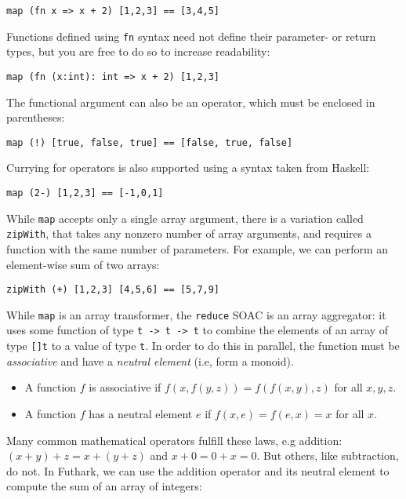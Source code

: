 \documentclass[11pt]{book}
\begin{document}
\begin{lstlisting}
map (fn x => x + 2) [1,2,3] == [3,4,5]
\end{lstlisting}

Functions defined using \texttt{fn} syntax need not define their
parameter- or return types, but you are free to do so to increase
readability:

\begin{lstlisting}
map (fn (x:int): int => x + 2) [1,2,3]
\end{lstlisting}

The functional argument can also be an operator, which must be
enclosed in parentheses:

\begin{lstlisting}
map (!) [true, false, true] == [false, true, false]
\end{lstlisting}

Currying for operators is also supported using a syntax taken from
Haskell:

\begin{lstlisting}
map (2-) [1,2,3] == [-1,0,1]
\end{lstlisting}

While \texttt{map} accepts only a single array argument, there is a
variation called \texttt{zipWith}, that takes any nonzero number of
array arguments, and requires a function with the same number of
parameters.  For example, we can perform an element-wise sum of two
arrays:

\begin{lstlisting}
zipWith (+) [1,2,3] [4,5,6] == [5,7,9]
\end{lstlisting}

While \texttt{map} is an array transformer, the \texttt{reduce} SOAC
is an array aggregator: it uses some function of type \texttt{t -> t
  -> t} to combine the elements of an array of type \texttt{[]t} to a
value of type \texttt{t}.  In order to do this in parallel, the
function must be \textit{associative} and have a \textit{neutral
  element} (i.e, form a monoid).

\begin{itemize}
\item A function $f$ is associative if $f(x,f(y,z)) = f(f(x,y),z)$ for
  all $x,y,z$.
\item A function $f$ has a neutral element $e$ if
  $f(x,e) = f(e,x) = x$ for all $x$.
\end{itemize}

Many common mathematical operators fulfill these laws, e.g addition:
$(x+y)+z=x+(y+z)$ and $x+0=0+x=0$.  But others, like subtraction, do
not.  In Futhark, we can use the addition operator and its neutral
element to compute the sum of an array of integers:
\end{document}
